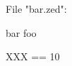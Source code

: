 
File "bar.zed":
\begin{zsection}
 \SECTION bar \parents foo
\end{zsection}

\begin{zed}
   XXX == 10
\end{zed}